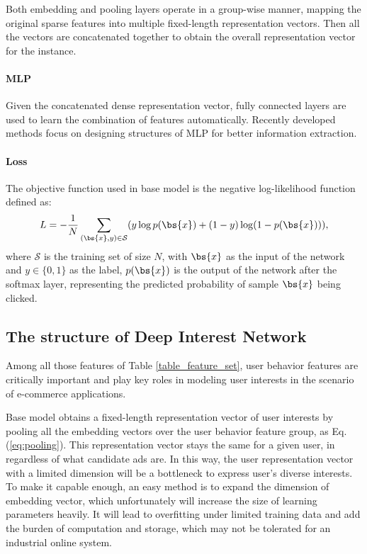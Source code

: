 Both embedding and pooling layers operate in a group-wise manner, mapping the original sparse features into multiple fixed-length representation vectors.   
Then all the vectors are concatenated together to obtain the overall representation vector for the instance. 

\paragraph{\textbf{MLP}} Given the concatenated dense representation vector, fully connected layers are used to learn the combination of features automatically. 
Recently developed methods \cite{widedeep,DeepFM,PNN} focus on designing structures of MLP for better information extraction. \par
\paragraph{\textbf{Loss}}The objective function used in base model is the negative log-likelihood function defined as:
\begin{equation}
    L= - \frac{1}{N} \sum_{(\bs{x},y)\in\mathcal{S}} (y\log p(\bs{x}) + (1-y)\log(1-p(\bs{x}))),
\end{equation}
where $\mathcal{S}$ is the training set of size $N$, with $\bs{x}$ as the input of the network and $y\in \{0,1\}$ as the label, $p(\bs{x})$ is the output of the network after the softmax layer, representing the predicted probability of sample $\bs{x}$ being clicked.


\subsection{The structure of Deep Interest Network}

Among all those features of Table \ref{table_feature_set}, user behavior features are critically important and play key roles in modeling user interests in the scenario of e-commerce applications.   

Base model obtains a fixed-length representation vector of user interests by pooling all the embedding vectors over the user behavior feature group, as Eq.(\ref{eq:pooling}). This representation vector stays the same for a given user, in regardless of what candidate ads are.
In this way, the user representation vector with a limited dimension will be a bottleneck to express user's diverse interests.
To make it capable enough, an easy method is to expand the dimension of embedding vector, which unfortunately will increase the size of learning parameters heavily.
It will lead to overfitting under limited training data and add the burden of computation and storage, which may not be tolerated for an industrial online system. 

